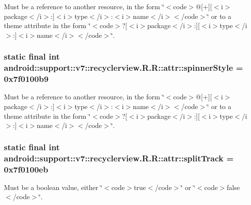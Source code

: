 Must be a reference to another resource, in the form \char`\"{}$<$code$>$@\mbox{[}+\mbox{]}\mbox{[}$<$i$>$package$<$/i$>$:\mbox{]}$<$i$>$type$<$/i$>$:$<$i$>$name$<$/i$>$$<$/code$>$\char`\"{} or to a theme attribute in the form \char`\"{}$<$code$>$?\mbox{[}$<$i$>$package$<$/i$>$:\mbox{]}\mbox{[}$<$i$>$type$<$/i$>$:\mbox{]}$<$i$>$name$<$/i$>$$<$/code$>$\char`\"{}. \hypertarget{classandroid_1_1support_1_1v7_1_1recyclerview_1_1_r_1_1attr_fae4501ae9f1ca3c650256e8af893aec}{
\subsubsection[{spinnerStyle}]{\setlength{\rightskip}{0pt plus 5cm}static final int android::support::v7::recyclerview.R.R::attr::spinnerStyle = 0x7f0100b9}}
\label{classandroid_1_1support_1_1v7_1_1recyclerview_1_1_r_1_1attr_fae4501ae9f1ca3c650256e8af893aec}


Must be a reference to another resource, in the form \char`\"{}$<$code$>$@\mbox{[}+\mbox{]}\mbox{[}$<$i$>$package$<$/i$>$:\mbox{]}$<$i$>$type$<$/i$>$:$<$i$>$name$<$/i$>$$<$/code$>$\char`\"{} or to a theme attribute in the form \char`\"{}$<$code$>$?\mbox{[}$<$i$>$package$<$/i$>$:\mbox{]}\mbox{[}$<$i$>$type$<$/i$>$:\mbox{]}$<$i$>$name$<$/i$>$$<$/code$>$\char`\"{}. \hypertarget{classandroid_1_1support_1_1v7_1_1recyclerview_1_1_r_1_1attr_8e2c92cb3138805145e8120cb089ecd8}{
\subsubsection[{splitTrack}]{\setlength{\rightskip}{0pt plus 5cm}static final int android::support::v7::recyclerview.R.R::attr::splitTrack = 0x7f0100eb}}
\label{classandroid_1_1support_1_1v7_1_1recyclerview_1_1_r_1_1attr_8e2c92cb3138805145e8120cb089ecd8}


Must be a boolean value, either \char`\"{}$<$code$>$true$<$/code$>$\char`\"{} or \char`\"{}$<$code$>$false$<$/code$>$\char`\"{}. 

